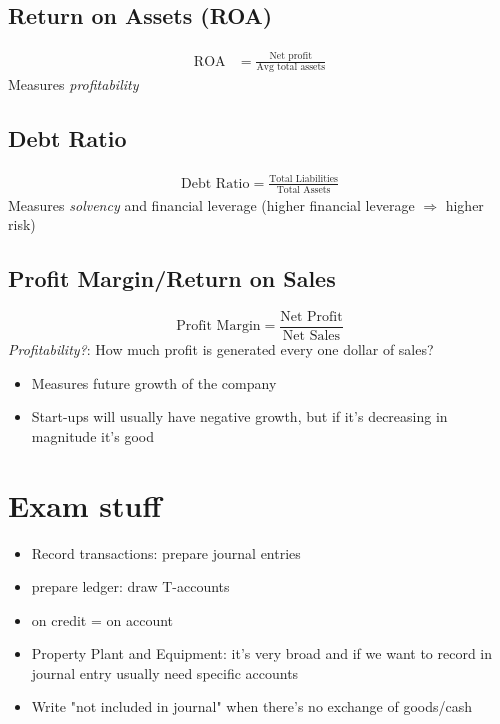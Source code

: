 \documentclass{article}
\begin{document}
\begin{multicols}{2}
\subsection{Return on Assets (ROA)}
\begin{equation*}
	\begin{aligned}
		\text{ROA} &= \frac{\text{Net profit}}{\text{Avg total assets}}
	\end{aligned}
\end{equation*}
Measures \textit{profitability}
\subsection{Debt Ratio}
\begin{equation*}
	\begin{aligned}
		\text{Debt Ratio} = \frac{\text{Total Liabilities}}{\text{Total Assets}}
	\end{aligned}
\end{equation*}
Measures \textit{solvency} and financial leverage (higher financial leverage $\Rightarrow$ higher risk)
\subsection{Profit Margin/Return on Sales}
$$\text{Profit Margin} = \frac{\text{Net Profit}}{\text{Net Sales}}$$
\textit{Profitability?}: How much profit is generated every one dollar of sales?
\begin{itemize}
	\item Measures future growth of the company
	\item Start-ups will usually have negative growth, but if it's decreasing in magnitude it's good
\end{itemize}

\section{Exam stuff}
\begin{itemize}
	\item Record transactions: prepare journal entries
	\item prepare ledger: draw T-accounts
	\item on credit = on account
	\item Property Plant and Equipment: it's very broad and if we want to record in journal entry usually need specific accounts
	\item Write "not included in journal" when there's no exchange of goods/cash
\end{itemize}
\end{multicols}
\end{document}
